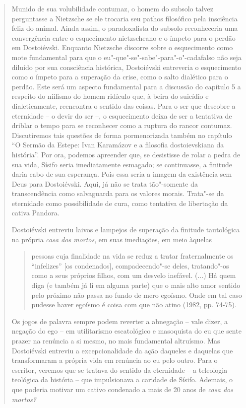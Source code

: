 {\begin{quote}
Munido de sua volubilidade contumaz, o homem do subsolo talvez
perguntasse a Nietzsche se ele trocaria seu pathos filosófico pela
insciência feliz do animal. Ainda assim, o paradoxalista do subsolo
reconheceria uma convergência entre o esquecimento nietzscheano e o
ímpeto para o perdão em Dostoiévski. Enquanto Nietzsche discorre sobre o
esquecimento como mote fundamental para que o
eu"-que"-se"-sabe"-para"-o"-cadafalso não seja diluído por sua consciência
histórica, Dostoiévski entreveria o esquecimento como o ímpeto para a
superação da crise, como o salto dialético para o perdão. Este será um
aspecto fundamental para a discussão do capítulo 5 a respeito do
niilismo do homem ridículo que, à beira do suicídio e dialeticamente,
reencontra o sentido das coisas. Para o ser que descobre a eternidade --
o devir do ser --, o esquecimento deixa de ser a tentativa de driblar o
tempo para se reconhecer como a ruptura do rancor contumaz. Discutiremos
tais questões de forma pormenorizada também no capítulo ``O Sermão da
Estepe: Ivan Karamázov e a filosofia dostoievskiana da história''. Por
ora, podemos apreender que, se desistisse de rolar a pedra de sua vida,
Sísifo seria imediatamente esmagado; se continuasse, a finitude daria
cabo de sua esperança. Pois essa seria a imagem da existência sem Deus
para Dostoiévski. Aqui, já não se trata tão"-somente da transcendência
como salvaguarda para os valores morais. Trata"-se da eternidade como
possibilidade de cura, como tentativa de libertação da cativa Pandora.

Dostoiévski entreviu laivos e lampejos de superação da finitude
tautológica na própria \emph{casa dos mortos}, em suas imediações, em
meio àquelas

\begin{quote}
pessoas cuja finalidade na vida se reduz a tratar fraternalmente os
``infelizes'' {[}os condenados{]}, compadecendo"-se deles, tratando"-os
como a seus próprios filhos, com um desvelo inefável. (...) Há quem diga
(e também já li em alguma parte) que o mais alto amor sentido pelo
próximo não passa no fundo de mero egoísmo. Onde em tal caso pudesse
haver egoísmo é coisa com que não atino (1982, pp. 74-75).
\end{quote}

Os jogos de palavra sempre podem reverter a abnegação -- vale dizer, a
negação do ego -- em utilitarismo escatológico e masoquista do eu que
sente prazer na renúncia a si mesmo, no mais fundamental altruísmo. Mas
Dostoiévski entreviu a excepcionalidade da ação daqueles e daquelas que
transformaram a própria vida em renúncia ao eu pelo outro. Para o
escritor, veremos que se tratava do sentido da eternidade -- a
teleologia teológica da história -- que impulsionava a caridade de
Sísifo. Ademais, o que poderia motivar um cativo condenado a mais de 20
anos de \emph{casa dos mortos? }


\end{quote}}
